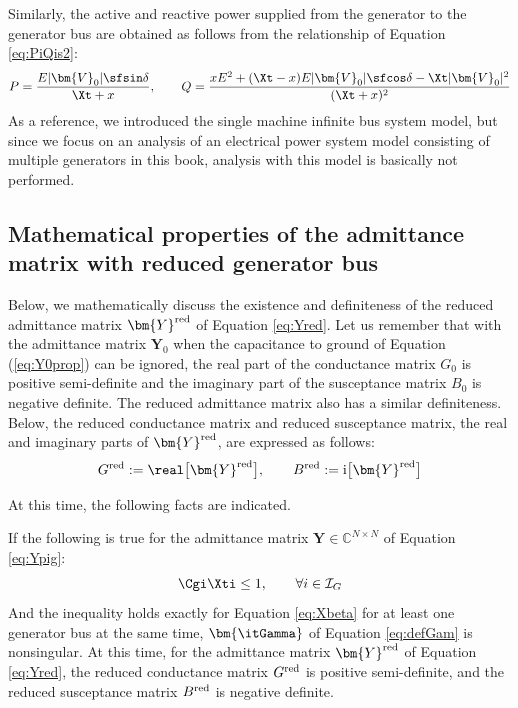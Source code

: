 \documentclass[graybox, envcountchap]{svmult}
\begin{document}
Similarly, the active and reactive power supplied from the generator to the generator bus are obtained as follows from the relationship of Equation \ref{eq:PiQis2}:
\[
P=\frac{
E|\bm{V}_0|\sfsin\delta
}{
\Xt + x
}
,\qquad
Q=
\frac{
x E^2 + (\Xt - x )E|\bm{V}_0|\sfcos\delta
- \Xt |\bm{V}_0|^2
}{
( \Xt + x )^2
}
\]
As a reference, we introduced the single machine infinite bus system model, but since we focus on an analysis of an electrical power system model consisting of multiple generators in this book, analysis with this model is basically not performed.


\subsection{Mathematical properties of the admittance matrix with reduced generator bus}

Below, we mathematically discuss the existence and definiteness of the reduced admittance matrix $\bm{Y}^{\rm red}$ of Equation \ref{eq:Yred}.
Let us remember that with the admittance matrix $\bm{Y}_0$ when the capacitance to ground of Equation (\ref{eq:Y0prop}) can be ignored, the real part of the conductance matrix $G_0$ is positive semi-definite and the imaginary part of the susceptance matrix $B_0$ is negative definite.
The reduced admittance matrix also has a similar definiteness.
Below, the reduced conductance matrix and reduced susceptance matrix, the real and imaginary parts of $\bm{Y}^{\rm red}$, are expressed as follows:
\begin{equation}\label{eq:GredBred}
G^{\rm red} :=\real\bigl[\bm{Y}^{\rm red}\bigr] ,\qquad
B^{\rm red} :=\imag\bigl[\bm{Y}^{\rm red}\bigr] 
\end{equation}

At this time, the following facts are indicated.


\begin{theorem}
\label{thm:redadmat}
If the following is true for the admittance matrix $\bm{Y}\in \mathbb{C}^{N\times N}$ of Equation \ref{eq:Ypig}:
\begin{equation}\label{eq:Xbeta}
\Cgi \Xti \leq 1
,\qquad \forall i \in \mathcal{I}_G
\end{equation}
And the inequality holds exactly for Equation \ref{eq:Xbeta} for at least one generator bus at the same time, $\bm{\itGamma}$ of Equation \ref{eq:defGam} is nonsingular.
At this time, for the admittance matrix $\bm{Y}^{\rm red}$ of Equation \ref{eq:Yred}, the reduced conductance matrix $G^{\rm red}$ is positive semi-definite, and the reduced susceptance matrix $B^{\rm red}$ is negative definite.
\end{theorem}
\end{document}
